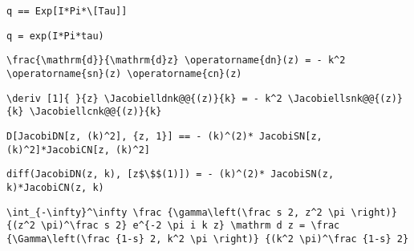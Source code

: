 \newsavebox\AZMM
\begin{lrbox}{\AZMM}
 \begin{minipage}[t]{0.82\textwidth}
  \lstinline[language={[latex]TeX},mathescape,breaklines=true]"q == Exp[I*Pi*\[Tau]]"
 \end{minipage}
\end{lrbox}
\newsavebox\AZMA
\begin{lrbox}{\AZMA}
 \begin{minipage}[t]{0.82\textwidth}
  \lstinline[language={[latex]TeX},mathescape,breaklines=true]"q = exp(I*Pi*tau)"
 \end{minipage}
\end{lrbox}
\newsavebox\BAT
\begin{lrbox}{\BAT}
 \begin{minipage}[t]{0.82\textwidth}
  \lstinline[language={[latex]TeX},mathescape,breaklines=true]"\frac{\mathrm{d}}{\mathrm{d}z} \operatorname{dn}(z) = - k^2 \operatorname{sn}(z) \operatorname{cn}(z)"
 \end{minipage}
\end{lrbox}
\newsavebox\BAST
\begin{lrbox}{\BAST}
 \begin{minipage}[t]{0.82\textwidth}
  \lstinline[language={[latex]TeX},mathescape,breaklines=true]"\deriv [1]{ }{z} \Jacobielldnk@@{(z)}{k} = - k^2 \Jacobiellsnk@@{(z)}{k} \Jacobiellcnk@@{(z)}{k}"
 \end{minipage}
\end{lrbox}
\newsavebox\BAMM
\begin{lrbox}{\BAMM}
 \begin{minipage}[t]{0.82\textwidth}
  \lstinline[language={[latex]TeX},mathescape,breaklines=true]"D[JacobiDN[z, (k)^2], {z, 1}] == - (k)^(2)* JacobiSN[z, (k)^2]*JacobiCN[z, (k)^2]"
 \end{minipage}
\end{lrbox}
\newsavebox\BAMA
\begin{lrbox}{\BAMA}
 \begin{minipage}[t]{0.82\textwidth}
  \lstinline[language={[latex]TeX},mathescape,breaklines=true]"diff(JacobiDN(z, k), [z$\$$(1)]) = - (k)^(2)* JacobiSN(z, k)*JacobiCN(z, k)"
 \end{minipage}
\end{lrbox}
\newsavebox\BBT
\begin{lrbox}{\BBT}
 \begin{minipage}[t]{0.82\textwidth}
  \lstinline[language={[latex]TeX},mathescape,breaklines=true]"\int_{-\infty}^\infty \frac {\gamma\left(\frac s 2, z^2 \pi \right)} {(z^2 \pi)^\frac s 2} e^{-2 \pi i k z} \mathrm d z = \frac {\Gamma\left(\frac {1-s} 2, k^2 \pi \right)} {(k^2 \pi)^\frac {1-s} 2}"
 \end{minipage}
\end{lrbox}
